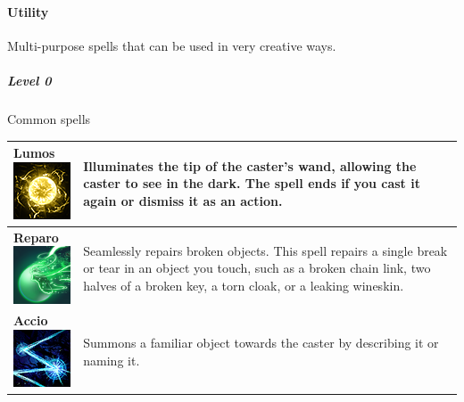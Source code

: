 \paragraph{Utility} 
Multi-purpose spells that can be used in very creative ways. 



\subparagraph{Level 0} 
Common spells \\
\begin{tabular}{ m{3cm}m{14cm} } \hline
	\specialcell[p]{\textbf{Lumos}         \\ \includegraphics[width=2.5cm]{../Pictures/Gameplay/Spells/Icon/Lumos_spell_icon.png}}         & Illuminates the tip of the caster's wand, allowing the caster to see in the dark. The spell ends if you cast it again or dismiss it as an action. \\ \hline
	\specialcell[p]{\textbf{Reparo}         \\ \includegraphics[width=2.5cm]{../Pictures/Gameplay/Spells/Icon/Reparo_spell_icon.png}}         & Seamlessly repairs broken objects. This spell repairs a single break or tear in an object you touch, such as a broken chain link, two halves of a broken key, a torn cloak, or a leaking wineskin. \\ \hline
	\specialcell[p]{\textbf{Accio}         \\ \includegraphics[width=2.5cm]{../Pictures/Gameplay/Spells/Icon/Accio_spell_icon.png}}         & Summons a familiar object towards the caster by describing it or naming it. \\ \hline
\end{tabular}


